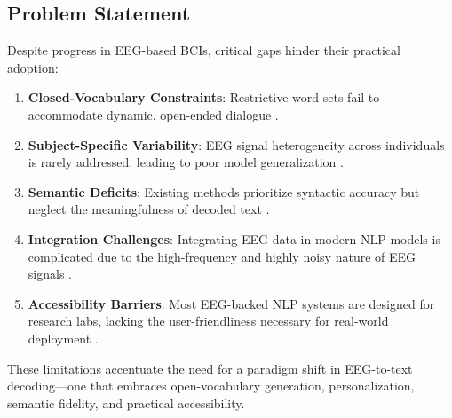\documentclass[journal]{IEEEtran}
\begin{document}
\subsection{Problem Statement}
Despite progress in EEG-based BCIs, critical gaps hinder their practical adoption:
\begin{enumerate}[label=(\arabic*)]
	\item \textbf{Closed-Vocabulary Constraints}: Restrictive word sets fail to accommodate dynamic, open-ended dialogue \cite{Wang2022}.
	\item \textbf{Subject-Specific Variability}: EEG signal heterogeneity across individuals is rarely addressed, leading to poor model generalization \cite{Jeng2020}.
	\item \textbf{Semantic Deficits}: Existing methods prioritize syntactic accuracy but neglect the meaningfulness of decoded text \cite{Gauthier2018}.
	\item \textbf{Integration Challenges}: Integrating EEG data in modern NLP models is complicated due to the high-frequency and highly noisy nature of EEG signals  \cite{Caucheteux2022}.
	\item \textbf{Accessibility Barriers}: Most EEG-backed NLP systems are designed for research labs, lacking the user-friendliness necessary for real-world deployment \cite{Nieto2022}.
\end{enumerate}

These limitations accentuate the need for a paradigm shift in EEG-to-text decoding—one that embraces open-vocabulary generation, personalization, semantic fidelity, and practical accessibility.
\end{document}
